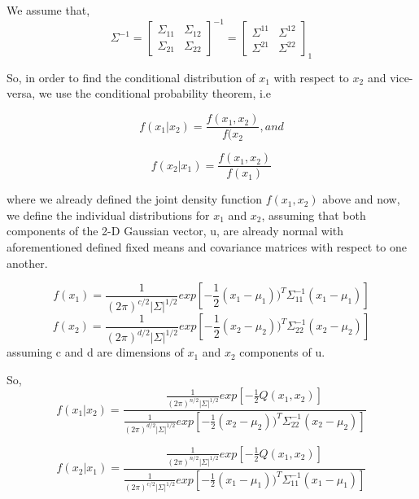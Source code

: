 \documentclass[12pt,a4paper]{article}
\begin{document}
We assume that,
\begin{equation*}
\Sigma^{-1} = \begin{bmatrix} \Sigma_{11} & \Sigma_{12} \\ 
\Sigma_{21} & \Sigma_{22} 
\end{bmatrix}^{-1}  = \begin{bmatrix}\Sigma^{11} & \Sigma^{12} \\ 
\Sigma^{21} & \Sigma^{22} 
\end{bmatrix}_1
\end{equation*}

So, in order to find the conditional distribution of $x_1$ with respect to $x_2$ and vice-versa, we use the conditional probability theorem, i.e

\begin{equation*}
f(x_1|x_2) = \frac{f(x_1,x_2)}{f(x_2} , and
\end{equation*}

\begin{equation*}
f(x_2|x_1) = \frac{f(x_1,x_2)}{f(x_1)}
\end{equation*} 

where we already defined the joint density function $f(x_1,x_2)$ above and now, we define the individual distributions for $x_1$ and $x_2$, assuming that both components of the 2-D Gaussian vector, u, are already normal with aforementioned defined fixed means and covariance matrices with respect to one another. 

\begin{equation*}
f(x_1) = \frac{1}{(2\pi )^{c/2}|\Sigma|^{1/2}}exp[-\frac{1}{2}(x_1-\mu_1))^T\Sigma_{11}^{-1}(x_1-\mu_1)] 
\end{equation*}
\begin{equation*}
f(x_2) = \frac{1}{(2\pi )^{d/2}|\Sigma|^{1/2}}exp[-\frac{1}{2}(x_2-\mu_2))^T\Sigma_{22}^{-1}(x_2-\mu_2)]
\end{equation*}
assuming c and d are dimensions of $x_1$ and $x_2$ components of u.

So,
\begin{equation*}
f(x_1|x_2) = \frac{ \frac{1}{(2\pi )^{n/2}|\Sigma|^{1/2}}exp[-\frac{1}{2}Q(x_1,x_2)]}{\frac{1}{(2\pi )^{d/2}|\Sigma|^{1/2}}exp[-\frac{1}{2}(x_2-\mu_2))^T\Sigma_{22}^{-1}(x_2-\mu_2)]}
\end{equation*}

\begin{equation*}
f(x_2|x_1) = \frac{\frac{1}{(2\pi )^{n/2}|\Sigma|^{1/2}}exp[-\frac{1}{2}Q(x_1,x_2)]}{\frac{1}{(2\pi )^{c/2}|\Sigma|^{1/2}}exp[-\frac{1}{2}(x_1-\mu_1))^T\Sigma_{11}^{-1}(x_1-\mu_1)] 
}
\end{equation*}
\end{document}
